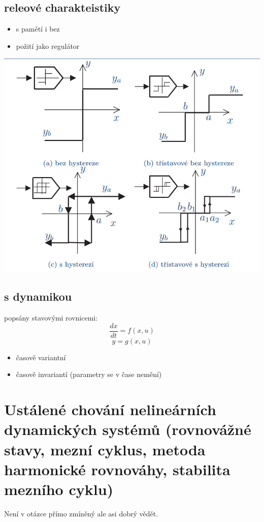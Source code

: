 \subsection*{releové charakteistiky}
\begin{itemize}
    \item s pamětí i bez
    \item požití jako regulátor
\end{itemize}
\includegraphics*{img/rele.png}

\subsection{s dynamikou}
popsány stavovými rovnicemi:
\[
    \frac{dx}{dt}=f(x,u)\]
    \[y=g(x,u)\]

\begin{itemize}   
    \item časově variantní
    \item časově invariantí (parametry se v čase nemění)
\end{itemize}
\newpage
\section{Ustálené chování nelineárních dynamických systémů (rovnovážné stavy, mezní cyklus, metoda
harmonické rovnováhy, stabilita mezního cyklu)}

Není v otázce přímo zmíněný ale asi dobrý vědět.


